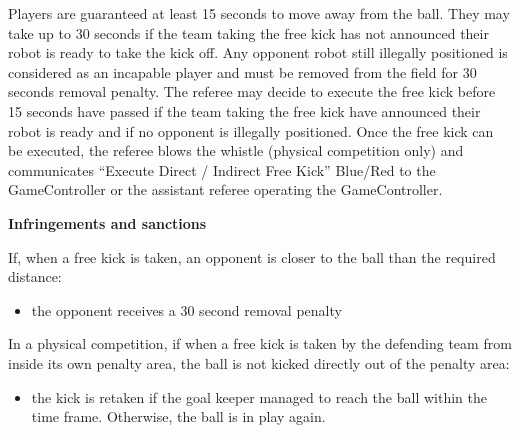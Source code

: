 Players are guaranteed at least 15 seconds to move away from the ball.
They may take up to 30 seconds if the team taking the free kick has not
announced their robot is ready to take the kick off.
Any opponent robot still illegally positioned is considered as an incapable
player and must be removed from the field for 30 seconds removal penalty.
The referee may decide to execute the free kick before 15 seconds have passed if
the team taking the free kick have announced their robot is ready and if no
opponent is illegally positioned.
Once the free kick can be executed, the referee blows the whistle (physical competition only) and communicates ``Execute Direct / Indirect Free Kick'' Blue/Red to the GameController or the assistant referee operating the GameController.

\bigskip

{\bfseries Infringements and sanctions}

\headlinebox

If, when a free kick is taken, an opponent is closer to the ball than the required distance:

\begin{itemize}
\item the opponent receives a 30 second removal penalty 
\end{itemize}


    In a physical competition, if when a free kick is taken by the defending team from inside its own
    penalty area, the ball is not kicked directly out of the penalty area:

  \begin{itemize}
  \item the kick is retaken if the goal keeper
      managed to reach the ball within the time frame. Otherwise, the ball is in
      play again.
  \end{itemize}
  \bigskip


